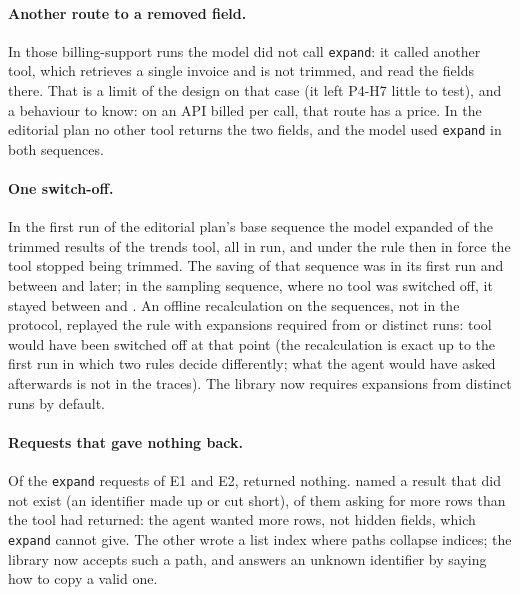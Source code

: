 \paragraph{Another route to a removed field.} In those \SthreeETwoOtherTool{} billing-support runs the model did not
call \texttt{expand}: it called another tool, which retrieves a single invoice and is not trimmed, and read the
fields there. That is a limit of the design on that case (it left P4-H7 little to test), and a behaviour to know:
on an API billed per call, that route has a price. In the editorial plan no other tool returns the two fields, and
the model used \texttt{expand} in both sequences.

\paragraph{One switch-off.} In the first run of the editorial plan's base sequence the model expanded
\SthreeSwitchExpanded{} of the \SthreeSwitchFiltered{} trimmed results of the trends tool, all in
\SthreeSwitchRunsWithExpand{} run, and under the rule then in force the tool stopped being trimmed. The saving of
that sequence was \SthreeSwitchSavingFirst{} in its first run and between \SthreeSwitchSavingLaterMin{} and
\SthreeSwitchSavingLaterMax{} later; in the sampling sequence, where no tool was switched off, it stayed between
\SthreeSwitchSamplingMin{} and \SthreeSwitchSamplingMax. An offline recalculation on the \SthreeETwoSequences{}
sequences, not in the protocol, replayed the rule with expansions required from \SthreeSwitchRuleA{} or
\SthreeSwitchRuleB{} distinct runs: \SthreeSwitchWithRules{} tool would have been switched off at that point (the
recalculation is exact up to the first run in which two rules decide differently; what the agent would have asked
afterwards is not in the traces). The library now requires expansions from \SthreeSwitchDefaultNow{} distinct runs
by default.

\paragraph{Requests that gave nothing back.} Of the \SthreeExpandRequests{} \texttt{expand} requests of E1 and E2,
\SthreeExpandNothing{} returned nothing. \SthreeExpandUnknownId{} named a result that did not exist (an identifier
made up or cut short), \SthreeExpandRows{} of them asking for more rows than the tool had returned: the agent wanted
more rows, not hidden fields, which \texttt{expand} cannot give. The other \SthreeExpandIndex{} wrote a list index
where paths collapse indices; the library now accepts such a path, and answers an unknown identifier by saying how
to copy a valid one.

